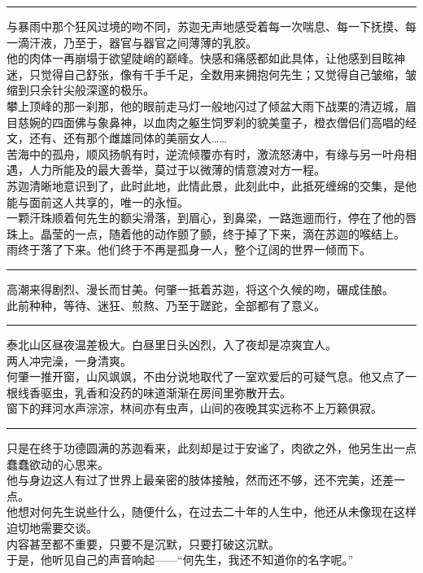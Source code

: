 \documentclass[oneside,11pt]{memoir} %
\begin{document}
\begin{CJK}{UTF8}{gbsn}
\rule{-3pt}{30pt}
    与暴雨中那个狂风过境的吻不同，苏迦无声地感受着每一次喘息、每一下抚摸、每一滴汗液，乃至于，器官与器官之间薄薄的乳胶。\\\indent
    他的肉体一再崩塌于欲望陡峭的巅峰。快感和痛感都如此具体，让他感到目眩神迷，只觉得自己舒张，像有千手千足，全数用来拥抱何先生；又觉得自己皱缩，皱缩到只余针尖般深邃的极乐。\\\indent
     攀上顶峰的那一刹那，他的眼前走马灯一般地闪过了倾盆大雨下战栗的清迈城，眉目慈婉的四面佛与象鼻神，以血肉之躯生饲罗刹的貌美童子，橙衣僧侣们高唱的经文，还有、还有那个雌雄同体的美丽女人……\\\indent
     苦海中的孤舟，顺风扬帆有时，逆流倾覆亦有时，激流怒涛中，有缘与另一叶舟相遇，人力所能及的最大善举，莫过于以微薄的情意渡对方一程。\\\indent
    苏迦清晰地意识到了，此时此地，此情此景，此刻此中，此抵死缠绵的交集，是他能与面前这人共享的，唯一的永恒。\\\indent
    一颗汗珠顺着何先生的额尖滑落，到眉心，到鼻梁，一路迤逦而行，停在了他的唇珠上。晶莹的一点，随着他的动作颤了颤，终于掉了下来，滴在苏迦的喉结上。\\\indent
     雨终于落了下来。他们终于不再是孤身一人，整个辽阔的世界一倾而下。\\\indent
\rule{-3pt}{30pt}
    高潮来得剧烈、漫长而甘美。何肇一抵着苏迦，将这个久候的吻，碾成佳酿。\\\indent
    此前种种，等待、迷狂、煎熬、乃至于蹉跎，全部都有了意义。\\\indent
\rule{-3pt}{30pt}
    泰北山区昼夜温差极大。白昼里日头凶烈，入了夜却是凉爽宜人。\\\indent
    两人冲完澡，一身清爽。\\\indent
    何肇一推开窗，山风飒飒，不由分说地取代了一室欢爱后的可疑气息。他又点了一根线香驱虫，乳香和没药的味道渐渐在房间里弥散开去。\\\indent
    窗下的拜河水声淙淙，林间亦有虫声，山间的夜晚其实远称不上万籁俱寂。\\\indent
\rule{-3pt}{30pt}
    只是在终于功德圆满的苏迦看来，此刻却是过于安谧了，肉欲之外，他另生出一点蠢蠢欲动的心思来。\\\indent
    他与身边这人有过了世界上最亲密的肢体接触，然而还不够，还不完美，还差一点。\\\indent
    他想对何先生说些什么，随便什么，在过去二十年的人生中，他还从未像现在这样迫切地需要交谈。\\\indent
    内容甚至都不重要，只要不是沉默，只要打破这沉默。\\\indent
    于是，他听见自己的声音响起——“何先生，我还不知道你的名字呢。”\\\indent

\end{CJK}
\end{document}
